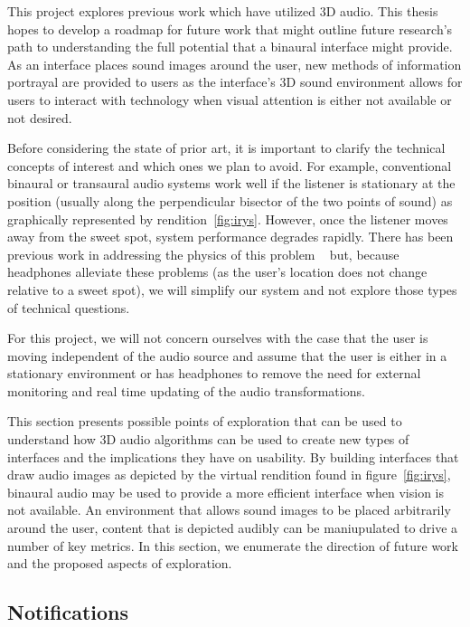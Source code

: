 This project explores previous work which have utilized 3D audio.  This thesis
hopes to develop a roadmap for future work that might outline future research's
path to understanding the full potential that a binaural interface might provide. 
As an interface places sound images around the user, new methods of information 
portrayal are provided to users as the interface's 3D sound environment allows
for users to interact with technology when visual attention is either not 
available or not desired.

Before considering the state of prior art, it is important to clarify the technical
concepts of interest and which ones we plan to avoid. For example, conventional binaural or
transaural audio systems work well if the listener is stationary at the position
(usually along the perpendicular bisector of the two points of sound) as 
graphically represented by rendition~\ref{fig:irys}. However, once the listener
moves away from the sweet spot, system performance degrades rapidly. There has
been previous work in addressing the physics of this problem ~\cite{song2010personal}
but, because headphones alleviate these problems (as the user's location does not
change relative to a sweet spot), we will simplify our system and not explore those
types of technical questions.

For this project, we will not concern ourselves with the case that the user is
moving independent of the audio source and assume that the user is either in a
stationary environment or has headphones to remove the need for external
monitoring and real time updating of the audio transformations.

This section presents possible points of exploration that can be used to understand
how 3D audio algorithms can be used to create new types of interfaces and the 
implications they have on usability. By building interfaces that draw audio images 
as depicted by the virtual rendition found in figure~\ref{fig:irys}, binaural audio
may be used to provide a more efficient interface when vision is not available. 
An environment that allows sound images to be placed arbitrarily around the user,
content that is depicted audibly can be maniupulated to drive a number of key 
metrics. In this section, we enumerate the direction of future work and the 
proposed aspects of exploration.

\subsection{                  Notifications                                  }

